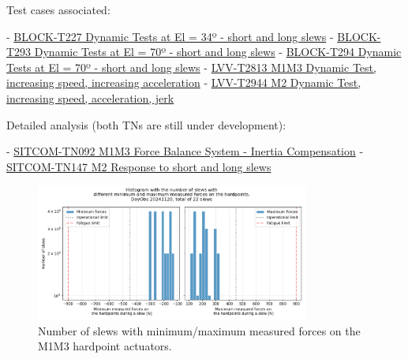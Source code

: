 Test cases associated:
\begin{itemize}
    - \href{https://rubinobs.atlassian.net/projects/BLOCK?selectedItem=com.atlassian.plugins.atlassian-connect-plugin:com.kanoah.test-manager__main-project-page#!/v2/testCase/BLOCK-T227}{BLOCK-T227 Dynamic Tests at El = 34º - short and long slews}
    - \href{https://rubinobs.atlassian.net/projects/BLOCK?selectedItem=com.atlassian.plugins.atlassian-connect-plugin:com.kanoah.test-manager__main-project-page#!/v2/testCase/BLOCK-T293}{BLOCK-T293 Dynamic Tests at El = 70º - short and long slews}
    - \href{https://rubinobs.atlassian.net/projects/BLOCK?selectedItem=com.atlassian.plugins.atlassian-connect-plugin:com.kanoah.test-manager__main-project-page#!/v2/testCase/BLOCK-T294}{BLOCK-T294 Dynamic Tests at El = 70º - short and long slews}
    - \href{https://rubinobs.atlassian.net/projects/LVV?selectedItem=com.atlassian.plugins.atlassian-connect-plugin:com.kanoah.test-manager__main-project-page#!/v2/testCase/LVV-T2813}{LVV-T2813 M1M3 Dynamic Test, increasing speed, increasing acceleration}
    - \href{https://rubinobs.atlassian.net/projects/LVV?selectedItem=com.atlassian.plugins.atlassian-connect-plugin:com.kanoah.test-manager__main-project-page#!/v2/testCase/LVV-T2944}{LVV-T2944 M2 Dynamic Test, increasing speed, acceleration, jerk}
\end{itemize}

Detailed analysis (both TNs are still under development):
\begin{itemize}
    - \href{https://sitcomtn-092.lsst.io/}{SITCOM-TN092 M1M3 Force Balance System - Inertia Compensation}
    - \href{https://sitcomtn-147.lsst.io/}{SITCOM-TN147 M2 Response to short and long slews}
\end{itemize}

\begin{figure}
    \centering
    \includegraphics[width=0.8\textwidth]{spa/M1M3_short_long_slews_10_histogram.png}
    \caption{Number of slews with minimum/maximum measured forces on the M1M3 hardpoint actuators.}
    \label{fig:m1m3_short_long_slews}
    \end{figure}

